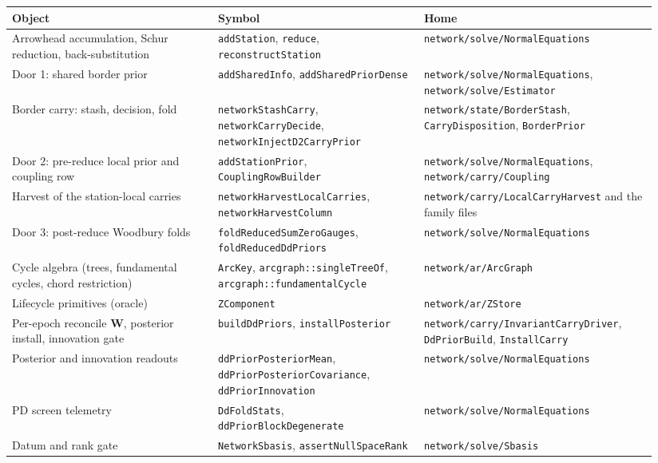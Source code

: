 \documentclass[main.tex]{subfiles}
\begin{document}
\begin{center}\small
\begin{tabular}{@{}p{0.30\linewidth}p{0.30\linewidth}p{0.34\linewidth}@{}}
\toprule
Object & Symbol & Home \\
\midrule
Arrowhead accumulation, Schur reduction, back-substitution &
  \texttt{addStation}, \texttt{reduce}, \texttt{reconstructStation} &
  \texttt{network/solve/Normal\-Equations} \\
Door 1: shared border prior &
  \texttt{addSharedInfo}, \texttt{addSharedPriorDense} &
  \texttt{network/solve/Normal\-Equations}, \texttt{network/solve/Estimator} \\
Border carry: stash, decision, fold &
  \texttt{networkStashCarry}, \texttt{networkCarryDecide}, \texttt{networkInjectD2CarryPrior} &
  \texttt{network/state/Border\-Stash}, \texttt{Carry\-Disposition}, \texttt{Border\-Prior} \\
Door 2: pre-reduce local prior and coupling row &
  \texttt{addStationPrior}, \texttt{CouplingRowBuilder} &
  \texttt{network/solve/Normal\-Equations}, \texttt{network/carry/Coupling} \\
Harvest of the station-local carries &
  \texttt{networkHarvestLocalCarries}, \texttt{networkHarvestColumn} &
  \texttt{network/carry/Local\-Carry\-Harvest} and the family files \\
Door 3: post-reduce Woodbury folds &
  \texttt{foldReducedSumZeroGauges}, \texttt{foldReducedDdPriors} &
  \texttt{network/solve/Normal\-Equations} \\
Cycle algebra (trees, fundamental cycles, chord restriction) &
  \texttt{ArcKey}, \texttt{arcgraph::singleTreeOf}, \texttt{arcgraph::fundamentalCycle} &
  \texttt{network/ar/Arc\-Graph} \\
Lifecycle primitives (oracle) &
  \texttt{ZComponent} &
  \texttt{network/ar/ZStore} \\
Per-epoch reconcile $\bm{W}$, posterior install, innovation gate &
  \texttt{buildDdPriors}, \texttt{installPosterior} &
  \texttt{network/carry/Invariant\-Carry\-Driver}, \texttt{Dd\-Prior\-Build}, \texttt{Install\-Carry} \\
Posterior and innovation readouts &
  \texttt{ddPriorPosteriorMean}, \texttt{ddPriorPosteriorCovariance},
  \texttt{ddPriorInnovation} &
  \texttt{network/solve/Normal\-Equations} \\
PD screen telemetry &
  \texttt{DdFoldStats}, \texttt{ddPriorBlockDegenerate} &
  \texttt{network/solve/Normal\-Equations} \\
Datum and rank gate &
  \texttt{NetworkSbasis}, \texttt{assertNullSpaceRank} &
  \texttt{network/solve/Sbasis} \\
\bottomrule
\end{tabular}
\end{center}

\ifSubfilesClassLoaded{\printbibliography}{}
\end{document}

